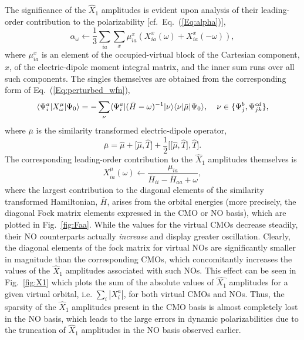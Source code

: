 The significance of the $\hat{X}_1$ amplitudes is evident upon analysis of
their leading-order contribution to the polarizability [cf.\
Eq.~(\ref{Eq:alpha})],
\begin{equation}
\alpha_\omega \leftarrow \frac{1}{3} \sum\limits_{ia}\sum\limits_x \mu^{x}_{ia}(X^x_{ia}(\omega) +
X^x_{ia}(-\omega)),
\label{Eq:leading_X1}
\end{equation} 
where $\mu^x_{ia}$ is an element of the occupied-virtual block of the
Cartesian component, $x$, of the electric-dipole moment integral matrix, and the inner
sum runs over all such components. The singles
themselves are obtained from the corresponding form of
Eq.~(\ref{Eq:perturbed_wfn}),
\begin{equation} 
\langle\Psi^a_i|X^{\mu}_{\omega}|\Psi_0\rangle =
-\sum_{\nu}\langle\Psi^a_i|(\bar{H} -
\omega)^{-1}|\nu\rangle\langle\nu|\bar{\mu}|\Psi_0\rangle,
\hspace{0.15in}\nu
\in \{\Psi^b_j,\Psi^{cd}_{jk}\},
\label{Eq:singles}
\end{equation} 
where $\bar{\mu}$ is the similarity transformed electric-dipole operator,
\begin{equation}
\bar{\mu} = \hat{\mu} + \bigg[\hat{\mu},\hat{T}\bigg] +
\frac{1}{2}\bigg[\bigg[\hat{\mu},\hat{T}\bigg],\hat{T}\bigg].
\label{Eq:mubar}
\end{equation}
The corresponding leading-order contribution to the $\hat{X}_1$ amplitudes themselves is
\begin{equation}
X^{\mu}_{ia}(\omega) \leftarrow \frac{\mu_{ia}}{\overbar{H}_{ii} -
\overbar{H}_{aa} + \omega},
\label{Eq:X1}
\end{equation}
where the largest contribution to the diagonal elements of the similarity
transformed Hamiltonian, $\bar{H}$, arises from the orbital energies (more
precisely, the diagonal Fock matrix elements expressed in the CMO or NO
basis), which are plotted in Fig.~\ref{fig:Faa}.  While the values for the
virtual CMOs decrease steadily, their NO counterparts actually {\em increase}
and display greater oscillation.  Clearly, the diagonal elements of the fock
matrix for virtual NOs are significantly smaller in magnitude than the
corresponding CMOs, which concomitantly increases the values of the
$\hat{X}_1$ amplitudes associated with such NOs.  This effect can be seen in
Fig.~\ref{fig:X1} which plots the sum of the absolute values of $\hat{X_1}$
amplitudes for a given virtual orbital, i.e.  $\sum_i |X_i^a|$, for both
virtual CMOs and NOs.  Thus, the sparsity of the $\hat{X}_1$ amplitudes present in the
CMO basis is almost completely lost in the NO basis, which leads to the large
errors in dynamic polarizabilities due to the truncation of $\hat{X}_1$
amplitudes in the NO basis observed earlier.  

